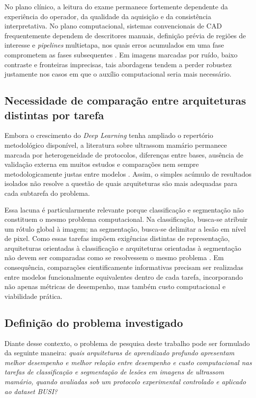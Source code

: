 \documentclass[tcc,capa]{texufpel}
\begin{document}
No plano clínico, a leitura do exame permanece fortemente dependente da experiência do operador, da qualidade da aquisição e da consistência interpretativa. No plano computacional, sistemas convencionais de CAD frequentemente dependem de descritores manuais, definição prévia de regiões de interesse e \textit{pipelines} multietapa, nos quais erros acumulados em uma fase comprometem as fases subsequentes \cite{Afrin2023,Yap2018,Chan2020}. Em imagens marcadas por ruído, baixo contraste e fronteiras imprecisas, tais abordagens tendem a perder robustez justamente nos casos em que o auxílio computacional seria mais necessário.

\subsection{Necessidade de comparação entre arquiteturas distintas por tarefa}

Embora o crescimento do \textit{Deep Learning} tenha ampliado o repertório metodológico disponível, a literatura sobre ultrassom mamário permanece marcada por heterogeneidade de protocolos, diferenças entre bases, ausência de validação externa em muitos estudos e comparações nem sempre metodologicamente justas entre modelos \cite{Dan2024,Pawlowska2023}. Assim, o simples acúmulo de resultados isolados não resolve a questão de quais arquiteturas são mais adequadas para cada subtarefa do problema.

Essa lacuna é particularmente relevante porque classificação e segmentação não constituem o mesmo problema computacional. Na classificação, busca-se atribuir um rótulo global à imagem; na segmentação, busca-se delimitar a lesão em nível de pixel. Como essas tarefas impõem exigências distintas de representação, arquiteturas orientadas à classificação e arquiteturas orientadas à segmentação não devem ser comparadas como se resolvessem o mesmo problema \cite{Zhou2021,Afrin2023}. Em consequência, comparações cientificamente informativas precisam ser realizadas entre modelos funcionalmente equivalentes dentro de cada tarefa, incorporando não apenas métricas de desempenho, mas também custo computacional e viabilidade prática.

\subsection{Definição do problema investigado}

Diante desse contexto, o problema de pesquisa deste trabalho pode ser formulado da seguinte maneira: \textit{quais arquiteturas de aprendizado profundo apresentam melhor desempenho e melhor relação entre desempenho e custo computacional nas tarefas de classificação e segmentação de lesões em imagens de ultrassom mamário, quando avaliadas sob um protocolo experimental controlado e aplicado ao dataset BUSI?}
\end{document}
